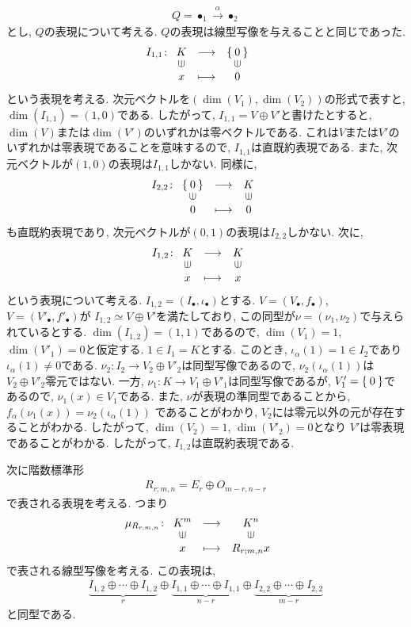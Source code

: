 \begin{example}
  \begin{align*}
    Q=\bullet_{1} \xrightarrow{\alpha} \bullet_{2}
  \end{align*}
  とし, $Q$の表現について考える.
  $Q$の表現は線型写像を与えることと同じであった.
  \begin{align*}
    I_{1,1}&\colon\Shazo{K}{\Set{0}}{x}{0}
  \end{align*}
  という表現を考える.
  次元ベクトルを$(\dim(V_1),\dim(V_2))$の形式で表すと,
  $\dim(I_{1,1})=(1,0)$である.
  したがって, $I_{1,1}=V\oplus V'$と書けたとすると,
  $\dim(V)$または$\dim(V')$のいずれかは零ベクトルである.
  これは$V$または$V'$のいずれかは零表現であることを意味するので,
  $I_{1,1}$は直既約表現である.
  また, 次元ベクトルが$(1,0)$の表現は$I_{1,1}$しかない.
  同様に,
  \begin{align*}
    I_{2,2}&\colon\Shazo{\Set{0}}{K}{0}{0}\\
  \end{align*}
  も直既約表現であり,
  次元ベクトルが$(0,1)$の表現は$I_{2,2}$しかない.
  次に,
  \begin{align*}
    I_{1,2}&\colon\Shazo{K}{K}{x}{x}
  \end{align*}
  という表現について考える.
  $I_{1,2}=(I_\bullet,\iota_\bullet)$とする.
  $V=(V_\bullet,f_\bullet)$,
  $V=(V'_\bullet,f'_\bullet)$が
  $I_{1,2}\simeq V\oplus V'$を満たしており,
  この同型が$\nu=(\nu_1,\nu_2)$で与えられているとする.
  $\dim(I_{1,2})=(1,1)$であるので,
  $\dim(V_1)=1$, $\dim(V'_1)=0$と仮定する. 
  $1\in I_{1}=K$とする.
  このとき, $\iota_{\alpha}(1)=1\in I_2$であり$\iota_{\alpha}(1)\neq 0$である.
  $\nu_2\colon I_2\to V_2\oplus V'_2$は同型写像であるので,
  $\nu_2(\iota_{\alpha}(1))$は$V_2\oplus V'_2$零元ではない.
  一方,
  $\nu_1\colon K\to V_1\oplus V'_1$は同型写像であるが,
  $V'_1=\Set{0}$であるので,
  $\nu_1(x)\in V_1$である.
  また,
  $\nu$が表現の準同型であることから,
  $f_{\alpha}(\nu_1(x))=\nu_2(\iota_{\alpha}(1))$
  であることがわかり, $V_2$には零元以外の元が存在することがわかる.
  したがって, $\dim(V_2)=1$, $\dim(V'_2)=0$となり
  $V'$は零表現であることがわかる.
  したがって, $I_{1,2}$は直既約表現である.

  次に階数標準形
  \begin{align*}
    R_{r;m,n}=E_r\oplus O_{m-r,n-r}
  \end{align*}
  で表される表現を考える.
  つまり
  \begin{align*}
    \mu_{R_{r;m,n}}&\colon\Shazo{K^m}{K^n}{x}{R_{r;m,n}x}
  \end{align*}
  で表される線型写像を考える.
  この表現は,
  \begin{align*}
    \underbrace{I_{1,2}\oplus\cdots\oplus I_{1,2}}_r
    \oplus
    \underbrace{I_{1,1}\oplus\cdots\oplus I_{1,1}}_{n-r}
    \oplus
    \underbrace{I_{2,2}\oplus\cdots\oplus I_{2,2}}_{m-r}
  \end{align*}
  と同型である.


\end{example}
